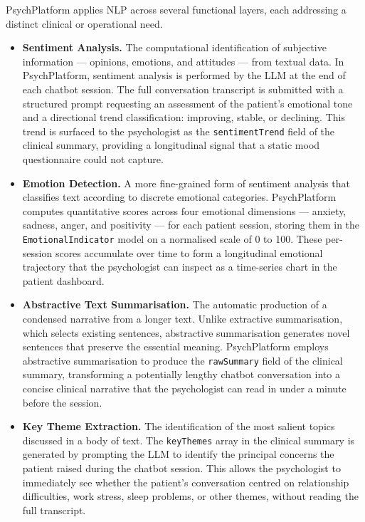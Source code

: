 \documentclass[a4paper,12pt]{report}
\begin{document}
PsychPlatform applies NLP across several functional layers, each addressing a distinct clinical or operational need.

\begin{itemize}[leftmargin=1.5em, itemsep=6pt]

  \item[--] \textbf{Sentiment Analysis.} The computational identification of subjective information --- opinions, emotions, and attitudes --- from textual data. In PsychPlatform, sentiment analysis is performed by the LLM at the end of each chatbot session. The full conversation transcript is submitted with a structured prompt requesting an assessment of the patient's emotional tone and a directional trend classification: improving, stable, or declining. This trend is surfaced to the psychologist as the \texttt{sentimentTrend} field of the clinical summary, providing a longitudinal signal that a static mood questionnaire could not capture.

  \item[--] \textbf{Emotion Detection.} A more fine-grained form of sentiment analysis that classifies text according to discrete emotional categories. PsychPlatform computes quantitative scores across four emotional dimensions --- anxiety, sadness, anger, and positivity --- for each patient session, storing them in the \texttt{EmotionalIndicator} model on a normalised scale of 0 to 100. These per-session scores accumulate over time to form a longitudinal emotional trajectory that the psychologist can inspect as a time-series chart in the patient dashboard.

  \item[--] \textbf{Abstractive Text Summarisation.} The automatic production of a condensed narrative from a longer text. Unlike extractive summarisation, which selects existing sentences, abstractive summarisation generates novel sentences that preserve the essential meaning. PsychPlatform employs abstractive summarisation to produce the \texttt{rawSummary} field of the clinical summary, transforming a potentially lengthy chatbot conversation into a concise clinical narrative that the psychologist can read in under a minute before the session.

  \item[--] \textbf{Key Theme Extraction.} The identification of the most salient topics discussed in a body of text. The \texttt{keyThemes} array in the clinical summary is generated by prompting the LLM to identify the principal concerns the patient raised during the chatbot session. This allows the psychologist to immediately see whether the patient's conversation centred on relationship difficulties, work stress, sleep problems, or other themes, without reading the full transcript.


\end{itemize}
\end{document}

